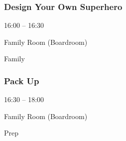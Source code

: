\documentclass{scrreprt}
\begin{document}
\begin{multicols}{2}
\subsubsection*{Design Your Own Superhero}\begin{description}
\setlength{\itemsep}{0pt}
\setlength{\parsep}{0pt}
\setlength{\parskip}{0pt}
\item[Time:]{16:00 -- 16:30}
\item[Venue:]{Family Room (Boardroom)}
\item[Tags:]{Family}\end{description}

\subsubsection*{Pack Up}\begin{description}
\setlength{\itemsep}{0pt}
\setlength{\parsep}{0pt}
\setlength{\parskip}{0pt}
\item[Time:]{16:30 -- 18:00}
\item[Venue:]{Family Room (Boardroom)}
\item[Tags:]{Prep}\end{description}
\end{multicols}
\end{document}
